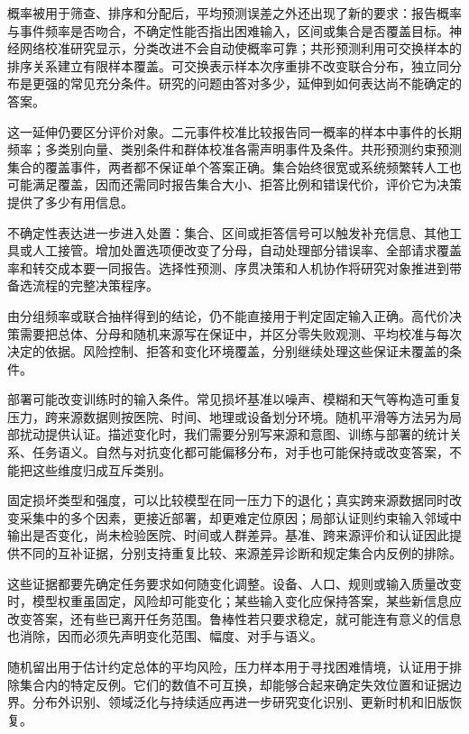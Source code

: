 概率被用于筛查、排序和分配后，平均预测误差之外还出现了新的要求：报告概率与事件频率是否吻合，不确定性能否指出困难输入，区间或集合是否覆盖目标。神经网络校准研究显示，分类改进不会自动使概率可靠；共形预测利用可交换样本的排序关系建立有限样本覆盖。可交换表示样本次序重排不改变联合分布，独立同分布是更强的常见充分条件。研究的问题由答对多少，延伸到如何表达尚不能确定的答案。

这一延伸仍要区分评价对象。二元事件校准比较报告同一概率的样本中事件的长期频率；多类别向量、类别条件和群体校准各需声明事件及条件。共形预测约束预测集合的覆盖事件，两者都不保证单个答案正确。集合始终很宽或系统频繁转人工也可能满足覆盖，因而还需同时报告集合大小、拒答比例和错误代价，评价它为决策提供了多少有用信息。

不确定性表达进一步进入处置：集合、区间或拒答信号可以触发补充信息、其他工具或人工接管。增加处置选项便改变了分母，自动处理部分错误率、全部请求覆盖率和转交成本要一同报告。选择性预测、序贯决策和人机协作将研究对象推进到带备选流程的完整决策程序。

由分组频率或联合抽样得到的结论，仍不能直接用于判定固定输入正确。高代价决策需要把总体、分母和随机来源写在保证中，并区分零失败观测、平均校准与每次决定的依据。风险控制、拒答和变化环境覆盖，分别继续处理这些保证未覆盖的条件。

部署可能改变训练时的输入条件。常见损坏基准以噪声、模糊和天气等构造可重复压力，跨来源数据则按医院、时间、地理或设备划分环境。随机平滑等方法另为局部扰动提供认证。描述变化时，我们需要分别写来源和意图、训练与部署的统计关系、任务语义。自然与对抗变化都可能偏移分布，对手也可能保持或改变答案，不能把这些维度归成互斥类别。

固定损坏类型和强度，可以比较模型在同一压力下的退化；真实跨来源数据同时改变采集中的多个因素，更接近部署，却更难定位原因；局部认证则约束输入邻域中输出是否变化，尚未检验医院、时间或人群差异。基准、跨来源评价和认证因此提供不同的互补证据，分别支持重复比较、来源差异诊断和规定集合内反例的排除。

这些证据都要先确定任务要求如何随变化调整。设备、人口、规则或输入质量改变时，模型权重虽固定，风险却可能变化；某些输入变化应保持答案，某些新信息应改变答案，还有些已离开任务范围。鲁棒性若只要求稳定，就可能连有意义的信息也消除，因而必须先声明变化范围、幅度、对手与语义。

随机留出用于估计约定总体的平均风险，压力样本用于寻找困难情境，认证用于排除集合内的特定反例。它们的数值不可互换，却能够合起来确定失效位置和证据边界。分布外识别、领域泛化与持续适应再进一步研究变化识别、更新时机和旧版恢复。

